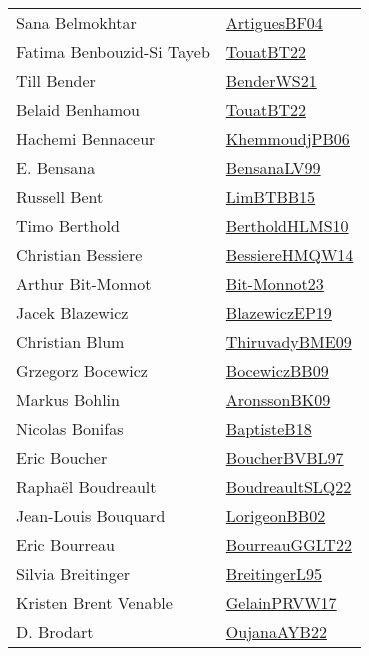 {\begin{longtable}{p{4cm}p{20cm}}
Sana Belmokhtar & \href{papers/ArtiguesBF04.pdf}{ArtiguesBF04}\cite{ArtiguesBF04} \\
Fatima Benbouzid{-}Si Tayeb & \href{papers/TouatBT22.pdf}{TouatBT22}\cite{TouatBT22} \\
Till Bender & \href{papers/BenderWS21.pdf}{BenderWS21}\cite{BenderWS21} \\
Belaid Benhamou & \href{papers/TouatBT22.pdf}{TouatBT22}\cite{TouatBT22} \\
Hachemi Bennaceur & \href{papers/KhemmoudjPB06.pdf}{KhemmoudjPB06}\cite{KhemmoudjPB06} \\
E. Bensana & \href{articles/BensanaLV99.pdf}{BensanaLV99}\cite{BensanaLV99} \\
Russell Bent & \href{papers/LimBTBB15.pdf}{LimBTBB15}\cite{LimBTBB15} \\
Timo Berthold & \href{papers/BertholdHLMS10.pdf}{BertholdHLMS10}\cite{BertholdHLMS10} \\
Christian Bessiere & \href{papers/BessiereHMQW14.pdf}{BessiereHMQW14}\cite{BessiereHMQW14} \\
Arthur Bit{-}Monnot & \href{papers/Bit-Monnot23.pdf}{Bit-Monnot23}\cite{Bit-Monnot23} \\
Jacek Blazewicz & \href{}{BlazewiczEP19}\cite{BlazewiczEP19} \\
Christian Blum & \href{papers/ThiruvadyBME09.pdf}{ThiruvadyBME09}\cite{ThiruvadyBME09} \\
Grzegorz Bocewicz & \href{}{BocewiczBB09}\cite{BocewiczBB09} \\
Markus Bohlin & \href{papers/AronssonBK09.pdf}{AronssonBK09}\cite{AronssonBK09} \\
Nicolas Bonifas & \href{articles/BaptisteB18.pdf}{BaptisteB18}\cite{BaptisteB18} \\
Eric Boucher & \href{}{BoucherBVBL97}\cite{BoucherBVBL97} \\
Rapha{\"{e}}l Boudreault & \href{papers/BoudreaultSLQ22.pdf}{BoudreaultSLQ22}\cite{BoudreaultSLQ22} \\
Jean{-}Louis Bouquard & \href{}{LorigeonBB02}\cite{LorigeonBB02} \\
Eric Bourreau & \href{articles/BourreauGGLT22.pdf}{BourreauGGLT22}\cite{BourreauGGLT22} \\
Silvia Breitinger & \href{}{BreitingerL95}\cite{BreitingerL95} \\
Kristen Brent Venable & \href{papers/GelainPRVW17.pdf}{GelainPRVW17}\cite{GelainPRVW17} \\
D. Brodart & \href{papers/OujanaAYB22.pdf}{OujanaAYB22}\cite{OujanaAYB22} \\

\end{longtable}}
